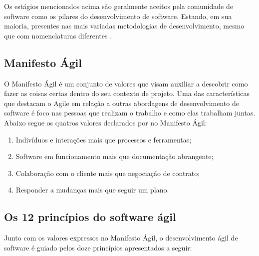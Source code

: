 Os estágios mencionados acima são geralmente aceitos pela comunidade de software
como os pilares do desenvolvimento de software. Estando, em sua maioria, presentes
nas mais variadas metodologias de desenvolvimento, mesmo que com nomenclaturas
diferentes \cite{Despa2014}.

\subsection{Manifesto Ágil}

O Manifesto Ágil é um conjunto de valores que visam auxiliar a descobrir como
fazer as coisas certas dentro do seu contexto de projeto. Uma das características
que destacam o Agile em relação a outras abordagens de desenvolvimento de software
é foco nas pessoas que realizam o trabalho e como elas trabalham juntas. Abaixo
segue os quatros valores declarados por  no Manifesto Ágil:

\begin{enumerate}
    \item Indivíduos e interações mais que processos e ferramentas;
    \item Software em funcionamento mais que documentação abrangente;
    \item Colaboração com o cliente mais que negociação de contrato;
    \item Responder a mudanças mais que seguir um plano.
\end{enumerate}

\subsection{Os 12 princípios do software ágil}

Junto com os valores expressos no Manifesto Ágil, o desenvolvimento ágil de software
é guiado pelos doze princípios apresentados a seguir:

